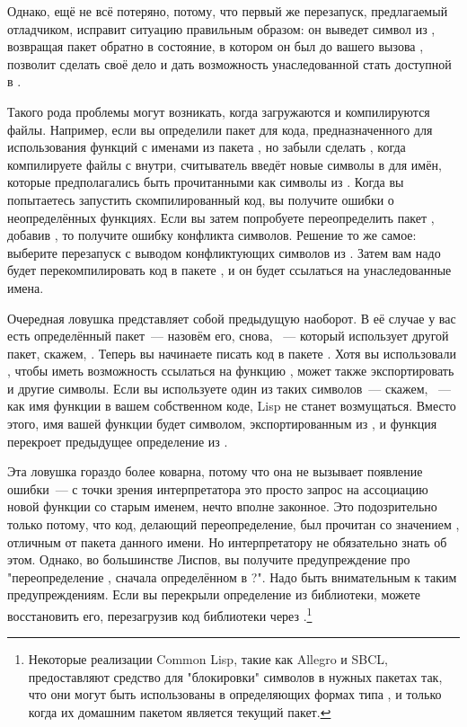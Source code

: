 Однако, ещё не всё потеряно, потому, что первый же перезапуск, предлагаемый отладчиком,
исправит ситуацию правильным образом: он выведет символ  из
, возвращая пакет  обратно в состояние, в котором он
был до вашего вызова , позволит  сделать своё дело и дать
возможность унаследованной  стать доступной в .

Такого рода проблемы могут возникать, когда загружаются и компилируются файлы. Например,
если вы определили пакет  для кода, предназначенного для использования
функций с именами из пакета , но забыли сделать , когда
компилируете файлы с  внутри, считыватель введёт новые символы
в  для имён, которые предполагались быть прочитанными как символы из
. Когда вы попытаетесь запустить скомпилированный код, вы получите ошибки о
неопределённых функциях. Если вы затем попробуете переопределить пакет ,
добавив , то получите ошибку конфликта символов. Решение то же самое:
выберите перезапуск с выводом конфликтующих символов из . Затем вам надо
будет перекомпилировать код в пакете , и он будет ссылаться на унаследованные
имена.

Очередная ловушка представляет собой предыдущую наоборот. В её случае у вас есть
определённый пакет~--- назовём его, снова, ~--- который использует другой
пакет, скажем, . Теперь вы начинаете писать код в пакете . Хотя
вы использовали , чтобы иметь возможность ссылаться на функцию ,
 может также экспортировать и другие символы. Если вы используете один из
таких символов~--- скажем, ~--- как имя функции в вашем собственном коде, Lisp
не станет возмущаться. Вместо этого, имя вашей функции будет символом, экспортированным из
, и функция перекроет предыдущее определение  из .

Эта ловушка гораздо более коварна, потому что она не вызывает появление ошибки~--- с точки
зрения интерпретатора это просто запрос на ассоциацию новой функции со старым именем,
нечто вполне законное. Это подозрительно только потому, что код, делающий переопределение,
был прочитан со значением , отличным от пакета данного имени. Но
интерпретатору не обязательно знать об этом. Однако, во большинстве Лиспов, вы получите
предупреждение про "переопределение , сначала определённом в ?". Надо быть
внимательным к таким предупреждениям. Если вы перекрыли определение из библиотеки, можете
восстановить его, перезагрузив код библиотеки через .\footnote{Некоторые
  реализации Common Lisp, такие как Allegro и SBCL, предоставляют средство для
  "блокировки" символов в нужных пакетах так, что они могут быть использованы в
  определяющих формах типа ,  и  только когда их
  домашним пакетом является текущий пакет.}

